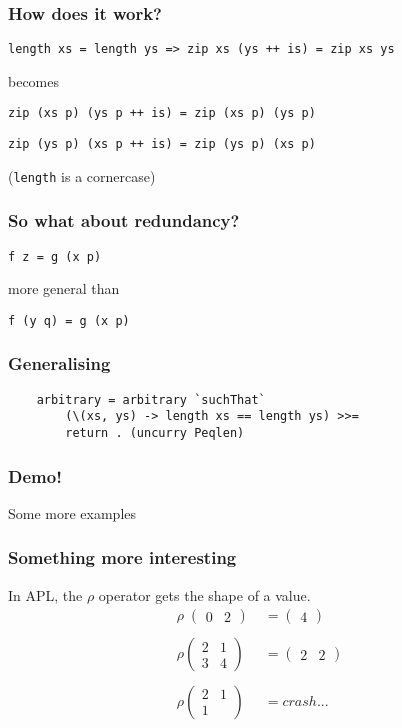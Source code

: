 \documentclass{beamer}
\begin{document}
\begin{frame}
    \frametitle{How does it work?}
    \centerline{\texttt{length xs = length ys => zip xs (ys ++ is) = zip xs ys}}
    \centerline{}
    \centerline{becomes}
    \centerline{}
    \centerline{\texttt{zip (xs p) (ys p ++ is) = zip (xs p) (ys p)}}
    \pause
    \centerline{}
    \centerline{\texttt{zip (ys p) (xs p ++ is) = zip (ys p) (xs p)}}
    \centerline{}
    \centerline{(\texttt{length} is a cornercase)}
\end{frame}

\begin{frame}
    \frametitle{So what about redundancy?}
    \Large{\centerline{\texttt{f z = g (x p)}}}
    \centerline{}
    \centerline{more general than}
    \centerline{}
    \Large{\centerline{\texttt{f (y q) = g (x p)}}}
\end{frame}

\begin{frame}[fragile]
    \frametitle{Generalising}
    \begin{verbatim}
    arbitrary = arbitrary `suchThat`
        (\(xs, ys) -> length xs == length ys) >>=
        return . (uncurry Peqlen) 
    \end{verbatim}   
\end{frame}

\begin{frame}
    \frametitle{Demo!}
    \Large{\centerline{Some more examples}}
\end{frame}

\begin{frame}
    \frametitle{Something more interesting}
    In APL, the $\rho$ operator gets the shape of a value.\\
    \begin{align*}
    \rho\;\begin{pmatrix} 0 & 2 \end{pmatrix}\; &= \begin{pmatrix}4\end{pmatrix}\\\\
    \rho \begin{pmatrix} 2 & 1 \\ 3 & 4 \end{pmatrix} &= \begin{pmatrix} 2 & 2\end{pmatrix}\\\\
    \rho \begin{pmatrix} 2 & 1 \\ 1 \end{pmatrix} &= crash...
    \end{align*}
\end{frame}
\end{document}

